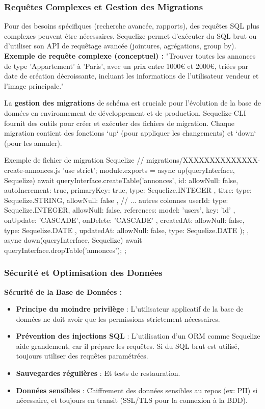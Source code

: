 \documentclass[11pt,a4paper]{report}
\newenvironment{codeblock}[1][Code Example]
  {\begin{tcolorbox}[colback=black!5!white, colframe=HousyGrey!70!black, title=#1, fonttitle=\bfseries\small, arc=2mm, boxrule=0.5pt,breakable]}
  {\end{tcolorbox}}
\begin{document}
\subsubsection{Requêtes Complexes et Gestion des Migrations}
Pour des besoins spécifiques (recherche avancée, rapports), des requêtes SQL plus complexes peuvent être nécessaires. Sequelize permet d'exécuter du SQL brut ou d'utiliser son API de requêtage avancée (jointures, agrégations, group by).
\textbf{Exemple de requête complexe (conceptuel) :}
"Trouver toutes les annonces de type 'Appartement' à 'Paris', avec un prix entre 1000€ et 2000€, triées par date de création décroissante, incluant les informations de l'utilisateur vendeur et l'image principale."

La \textbf{gestion des migrations} de schéma est cruciale pour l'évolution de la base de données en environnement de développement et de production. Sequelize-CLI fournit des outils pour créer et exécuter des fichiers de migration. Chaque migration contient des fonctions `up` (pour appliquer les changements) et `down` (pour les annuler).
\begin{codeblock}{Exemple de fichier de migration Sequelize}
// migrations/XXXXXXXXXXXXXX-create-annonces.js
'use strict';
module.exports = {
  async up(queryInterface, Sequelize) {
    await queryInterface.createTable('annonces', {
      id: { allowNull: false, autoIncrement: true, primaryKey: true, type: Sequelize.INTEGER },
      titre: { type: Sequelize.STRING, allowNull: false },
      // ... autres colonnes
      userId: {
        type: Sequelize.INTEGER,
        allowNull: false,
        references: { model: 'users', key: 'id' },
        onUpdate: 'CASCADE',
        onDelete: 'CASCADE'
      },
      createdAt: { allowNull: false, type: Sequelize.DATE },
      updatedAt: { allowNull: false, type: Sequelize.DATE }
    });
  },
  async down(queryInterface, Sequelize) {
    await queryInterface.dropTable('annonces');
  }
};
\end{codeblock}

\subsubsection{Sécurité et Optimisation des Données}
\textbf{Sécurité de la Base de Données :}
\begin{itemize}[label=\textcolor{HousyOrange}{\textbullet}]
    \item \textbf{Principe du moindre privilège} : L'utilisateur applicatif de la base de données ne doit avoir que les permissions strictement nécessaires.
    \item \textbf{Prévention des injections SQL} : L'utilisation d'un ORM comme Sequelize aide grandement, car il prépare les requêtes. Si du SQL brut est utilisé, toujours utiliser des requêtes paramétrées.
    \item \textbf{Sauvegardes régulières} : Et tests de restauration.
    \item \textbf{Données sensibles} : Chiffrement des données sensibles au repos (ex: PII) si nécessaire, et toujours en transit (SSL/TLS pour la connexion à la BDD).
\end{itemize}
\end{document}
